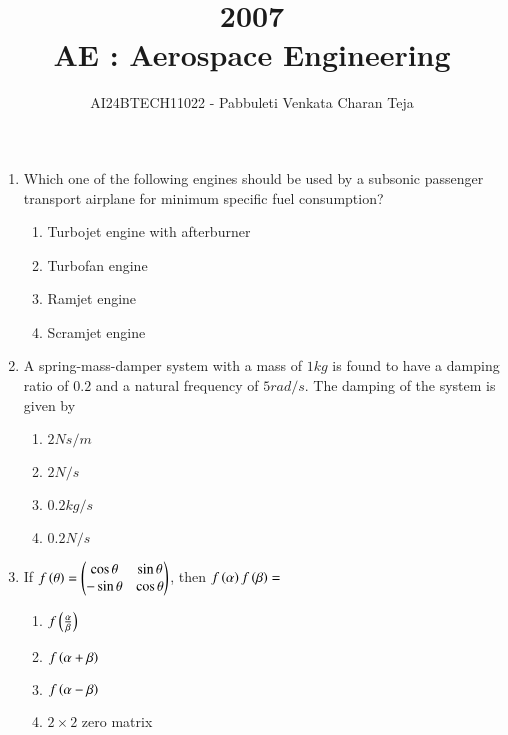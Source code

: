 \documentclass[journal]{IEEEtran}
\begin{document}

\vspace{3cm}

\title{2007\\AE : Aerospace Engineering}
\author{AI24BTECH11022 - Pabbuleti Venkata Charan Teja}
\maketitle

\renewcommand{\thefigure}{\theenumi}
\renewcommand{\thetable}{\theenumi}


\begin{enumerate}
\item Which one of the following engines should be used by a subsonic passenger transport airplane for minimum specific fuel consumption?
\begin{multicols}{2}
\begin{enumerate}
\item Turbojet engine with afterburner
\item Turbofan engine 
\item Ramjet engine
\item Scramjet engine
\end{enumerate}
\end{multicols}


\item A spring-mass-damper system with a mass of $1kg$ is found to have a damping ratio of $0.2$ and a natural frequency of $5rad/s$. The damping of the system is given by
\begin{multicols}{2}
\begin{enumerate}
\item $2Ns/m$
\item $2N/s$
\item $0.2kg/s$
\item $0.2N/s$
\end{enumerate}
\end{multicols}


\item If $f\left(\theta\right)=\begin{pmatrix}\cos{\theta}&\sin{\theta}\\ -\sin{\theta}&\cos{\theta}\end{pmatrix}$, then $f\left(\alpha\right)f\left(\beta\right)=$
\begin{multicols}{2}
\begin{enumerate}
\item $f\left(\frac{\alpha}{\beta}\right)$
\item $f\left(\alpha+\beta\right)$
\item $f\left(\alpha-\beta\right)$
\item $2\times 2$ zero matrix 
\end{enumerate}
\end{multicols}



\end{enumerate}
\end{document}
